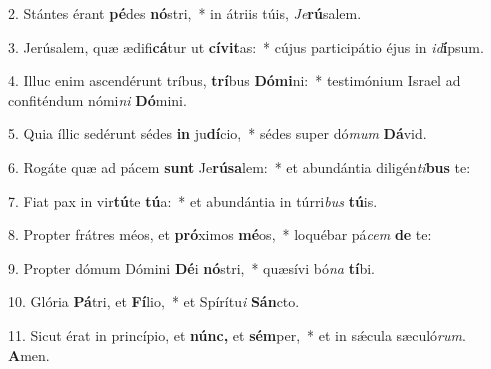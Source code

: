 \item 2. Stántes érant \textbf{pé}des \textbf{nó}stri,~* in átriis túis, \thinspace\textit{Je}\textbf{rú}salem.

\item 3. Jerúsalem, quæ ædifi\textbf{cá}tur ut \textbf{cívit}as:~* cújus participátio éjus in \textit{id}\textbf{í}psum.

\item 4. Illuc enim ascendérunt tríbus, \textbf{trí}bus \textbf{Dómi}ni:~* testimónium Israel ad confiténdum nómi\textit{ni} \textbf{Dó}mini.

\item 5. Quia íllic sedérunt sédes \textbf{in} ju\textbf{dí}cio,~* sédes super dó\textit{mum} \textbf{Dá}vid.

\item 6. Rogáte quæ ad pácem \textbf{sunt} Je\textbf{rúsa}lem:~* et abundántia diligén\textit{ti}\textbf{bus} te:

\item 7. Fiat pax in vir\textbf{tú}te \textbf{tú}a:~* et abundántia in túrri\textit{bus} \textbf{tú}is.

\item 8. Propter frátres méos, et \textbf{pró}ximos \textbf{mé}os,~* loquébar pá\textit{cem} \textbf{de} te:

\item 9. Propter dómum Dómini \textbf{Dé}i \textbf{nó}stri,~* quæsívi bó\textit{na} \textbf{tí}bi.

\item 10. Glória \textbf{Pá}tri, et \textbf{Fí}lio,~* et Spírítu\textit{i} \textbf{Sán}cto.

\item 11. Sicut érat in princípio, et \textbf{núnc,} et \textbf{sém}per,~* et in sǽcula sæculó\textit{rum}. \textbf{A}men.